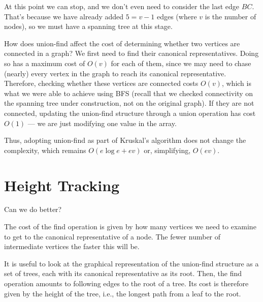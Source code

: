 At this point we can stop, and we don't even need to consider the last
edge $BC$.  That's because we have already added $5 = v-1$ edges
(where $v$ is the number of nodes), so we must have a spanning tree at
this stage.

\medskip%
How does union-find affect the cost of determining whether two
vertices are connected in a graph?  We first need to find their
canonical representatives.  Doing so has a maximum cost of $O(v)$ for
each of them, since we may need to chase (nearly) every vertex in the
graph to reach its canonical representative.  Therefore, checking
whether these vertices are connected costs $O(v)$, which is what we
were able to achieve using BFS (recall that we checked connectivity on
the spanning tree under construction, not on the original graph).
If they are not connected, updating the union-find structure through a
union operation has cost $O(1)$ --- we are just modifying one value in
the array.

Thus, adopting union-find as part of Kruskal's algorithm does not
change the complexity, which remains $O(e \log e + ev)$ or,
simplifying, $O(ev)$.


\section{Height Tracking}
\label{sec:unionfind:height_tracking}

Can we do better?

The cost of the find operation is given by how many vertices we need
to examine to get to the canonical representative of a node.  The
fewer number of intermediate vertices the faster this will be.

It is useful to look at the graphical representation of the union-find
structure as a set of trees, each with its canonical representative as
its root.  Then, the find operation amounts to following edges to the
root of a tree.  Its cost is therefore given by the height of the
tree, i.e., the longest path from a leaf to the root.

